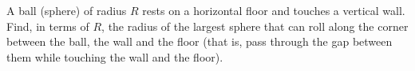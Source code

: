 A ball (sphere) of radius $R$ rests on a horizontal floor and touches a vertical wall. Find, in terms of $R$, the radius of the largest sphere that can roll along the corner between the ball, the wall and the floor (that is, pass through the gap between them while touching the wall and the floor).
